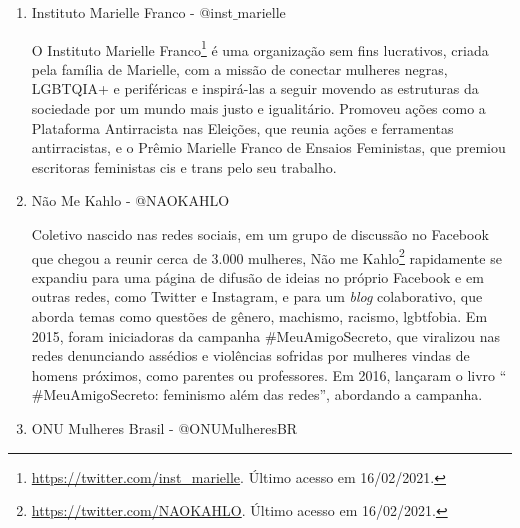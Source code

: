 \documentclass[
	12pt,				%
	openright,			%
	twoside,			%
	a4paper,			%
	english,			%
	brazil				%
	]{abntex2}
\begin{document}
\begin{anexosenv}
\begin{enumerate}
 Organização da sociedade civil que se posiciona em defesa de mulheres e negros, o Instituto Geledés\footnote{\url{https://twitter.com/geledes}. Último acesso em 16/02/2021.} posiciona-se também contra todas as demais formas de discriminação, como homofobia, lesbofobia, preconceitos regionais, de credo, opinião e de classe social. O portal da organização é um espaço de expressão pública das ações realizadas pela organização e de seus compromissos com a defesa da cidadania e dos direitos humanos, e a denúncia permanente dos entraves que persistem para a concretização da justiça social e da igualdade de direitos e de oportunidades em nossa sociedade. O portal possui principalmente postagens sobre questões de gênero e raciais, sobre discriminação e preconceitos e sobre a África e sua diáspora.

 \item Instituto Marielle Franco - @inst$\_$marielle
 
 O Instituto Marielle Franco\footnote{\url{https://twitter.com/inst_marielle}. Último acesso em 16/02/2021.} é uma organização sem fins lucrativos, criada pela família de Marielle, com a missão de conectar mulheres negras, LGBTQIA+ e periféricas e inspirá-las a seguir movendo as estruturas da sociedade por um mundo mais justo e igualitário. Promoveu ações como a Plataforma Antirracista nas Eleições, que reunia ações e ferramentas antirracistas, e o Prêmio Marielle Franco de Ensaios Feministas, que premiou escritoras feministas cis e trans pelo seu trabalho.
 
 \item Não Me Kahlo - @NAOKAHLO
 
 Coletivo nascido nas redes sociais, em um grupo de discussão no Facebook que chegou a reunir cerca de 3.000 mulheres, Não me Kahlo\footnote{\url{https://twitter.com/NAOKAHLO}. Último acesso em 16/02/2021.} rapidamente se expandiu para uma página de difusão de ideias no próprio Facebook e em outras redes, como Twitter e Instagram, e para um \textit{blog} colaborativo, que aborda temas como questões de gênero, machismo, racismo, lgbtfobia. Em 2015, foram iniciadoras da campanha $\#$MeuAmigoSecreto, que viralizou nas redes denunciando assédios e violências sofridas por mulheres vindas de homens próximos, como parentes ou professores. Em 2016, lançaram o livro ``$\#$MeuAmigoSecreto: feminismo além das redes'', abordando a campanha.

 \item ONU Mulheres Brasil - @ONUMulheresBR
 

\end{enumerate}
\end{anexosenv}
\end{document}
